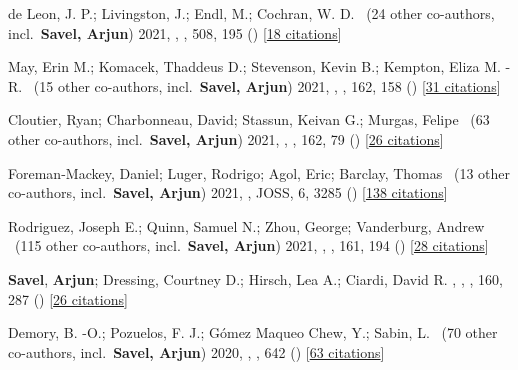 \item[{\color{numcolor}\scriptsize7}] de Leon, J. P.; Livingston, J.; Endl, M.; Cochran, W. D. \etal\ ({24} other co-authors, incl.\ \textbf{Savel, Arjun}) 2021, , \mnras, {508}, 195 () [\href{https://ui.adsabs.harvard.edu/abs/2021MNRAS.508..195D}{18 citations}]

\item[{\color{numcolor}\scriptsize6}] May, Erin M.; Komacek, Thaddeus D.; Stevenson, Kevin B.; Kempton, Eliza M. -R. \etal\ ({15} other co-authors, incl.\ \textbf{Savel, Arjun}) 2021, , \aj, {162}, 158 () [\href{https://ui.adsabs.harvard.edu/abs/2021AJ....162..158M}{31 citations}]

\item[{\color{numcolor}\scriptsize5}] Cloutier, Ryan; Charbonneau, David; Stassun, Keivan G.; Murgas, Felipe \etal\ ({63} other co-authors, incl.\ \textbf{Savel, Arjun}) 2021, , \aj, {162}, 79 () [\href{https://ui.adsabs.harvard.edu/abs/2021AJ....162...79C}{26 citations}]

\item[{\color{numcolor}\scriptsize4}] Foreman-Mackey, Daniel; Luger, Rodrigo; Agol, Eric; Barclay, Thomas \etal\ ({13} other co-authors, incl.\ \textbf{Savel, Arjun}) 2021, , JOSS, {6}, 3285 () [\href{https://ui.adsabs.harvard.edu/abs/2021JOSS....6.3285F}{138 citations}]

\item[{\color{numcolor}\scriptsize3}] Rodriguez, Joseph E.; Quinn, Samuel N.; Zhou, George; Vanderburg, Andrew \etal\ ({115} other co-authors, incl.\ \textbf{Savel, Arjun}) 2021, , \aj, {161}, 194 () [\href{https://ui.adsabs.harvard.edu/abs/2021AJ....161..194R}{28 citations}]

\item[{\color{numcolor}\scriptsize2}] \textbf{Savel}, \textbf{Arjun}; Dressing, Courtney D.; Hirsch, Lea A.; Ciardi, David R. , , \aj, {160}, 287 () [\href{https://ui.adsabs.harvard.edu/abs/2020AJ....160..287S}{26 citations}]

\item[{\color{numcolor}\scriptsize1}] Demory, B. -O.; Pozuelos, F. J.; G{\'o}mez Maqueo Chew, Y.; Sabin, L. \etal\ ({70} other co-authors, incl.\ \textbf{Savel, Arjun}) 2020, , \aanda, {642} () [\href{https://ui.adsabs.harvard.edu/abs/2020A&A...642A..49D}{63 citations}]